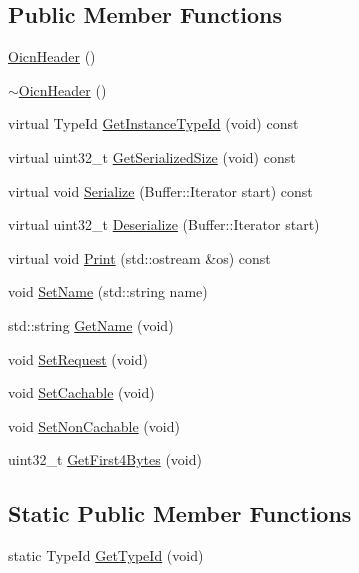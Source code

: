 \subsection*{Public Member Functions}
\begin{DoxyCompactItemize}
\item 
\hyperlink{classns3_1_1OicnHeader_a496135b4907b91cabe5387a4917994a5}{Oicn\-Header} ()
\item 
\hyperlink{classns3_1_1OicnHeader_af7ce0b989e6cd7123b984bcfb205150d}{$\sim$\-Oicn\-Header} ()
\item 
virtual Type\-Id \hyperlink{classns3_1_1OicnHeader_a39c2a2431d2aef132ac52e1d1ab1e892}{Get\-Instance\-Type\-Id} (void) const 
\item 
virtual uint32\-\_\-t \hyperlink{classns3_1_1OicnHeader_a4b0ba5fa4fe164e9e42a23a9a7b43268}{Get\-Serialized\-Size} (void) const 
\item 
virtual void \hyperlink{classns3_1_1OicnHeader_a427490fecb88ecfdb3576ab39ed31f5e}{Serialize} (Buffer\-::\-Iterator start) const 
\item 
virtual uint32\-\_\-t \hyperlink{classns3_1_1OicnHeader_af16eaf62f9048fe56e714f44459f754d}{Deserialize} (Buffer\-::\-Iterator start)
\item 
virtual void \hyperlink{classns3_1_1OicnHeader_ac5b6b41e69772b2c018adc0c313fc315}{Print} (std\-::ostream \&os) const 
\item 
void \hyperlink{classns3_1_1OicnHeader_afd6c18de6e052e61ed4de112c5724a18}{Set\-Name} (std\-::string name)
\item 
std\-::string \hyperlink{classns3_1_1OicnHeader_a00f48c0a31a66618f6c92431520801c3}{Get\-Name} (void)
\item 
void \hyperlink{classns3_1_1OicnHeader_ad49869449f12e894cc2dfb193d1a0181}{Set\-Request} (void)
\item 
void \hyperlink{classns3_1_1OicnHeader_a08a99a9ac99df2fca8af740137d47992}{Set\-Cachable} (void)
\item 
void \hyperlink{classns3_1_1OicnHeader_aa1e7e27b1b855587f0bf855c77b1ad64}{Set\-Non\-Cachable} (void)
\item 
uint32\-\_\-t \hyperlink{classns3_1_1OicnHeader_a9b5651fe0d172672e3e020c5df84a1c1}{Get\-First4\-Bytes} (void)
\end{DoxyCompactItemize}
\subsection*{Static Public Member Functions}
\begin{DoxyCompactItemize}
\item 
static Type\-Id \hyperlink{classns3_1_1OicnHeader_a275c1bad03b9f9ec4f11346a93061ac6}{Get\-Type\-Id} (void)
\end{DoxyCompactItemize}
